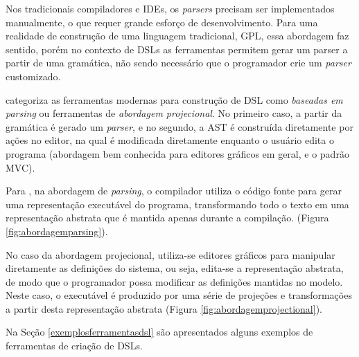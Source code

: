 Nos tradicionais compiladores e \gls{IDE}s, os \textit{parsers} precisam ser implementados manualmente, o que requer grande esforço de desenvolvimento. Para uma realidade de construção de uma linguagem tradicional, \gls{GPL}, essa abordagem faz sentido, porém no contexto de \gls{DSL}s as ferramentas permitem gerar um parser a partir de uma gramática, não sendo necessário que o programador crie um \textit{parser} customizado.

 categoriza as ferramentas modernas para construção de \gls{DSL} como \textit{baseadas em parsing} ou ferramentas de \textit{abordagem projecional}. No primeiro caso, a partir da gramática é gerado um \textit{parser}, e no segundo, a \gls{AST} é construída diretamente por ações no editor, na qual é modificada diretamente enquanto o usuário edita o programa (abordagem bem conhecida para editores gráficos em geral, e o padrão \gls{MVC}). 

Para , na abordagem de \textit{parsing}, o compilador utiliza o código fonte para gerar uma representação executável do programa, transformando todo o texto em uma representação abstrata que é mantida apenas durante a compilação. (Figura \ref{fig:abordagemparsing}). 



\newpage
No caso da abordagem projecional, utiliza-se editores gráficos para manipular diretamente as definições do sistema, ou seja, edita-se a representação abstrata, de modo que o programador possa modificar as definições mantidas no modelo. Neste caso, o executável é produzido por uma série de projeções e transformações a partir desta representação abstrata (Figura \ref{fig:abordagemprojectional}).




Na Seção \ref{exemplosferramentasdsl} são apresentados alguns exemplos de ferramentas de criação de \gls{DSL}s.

